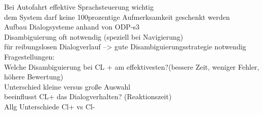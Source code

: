 \documentclass[12pt,a4paper]{scrartcl}
\begin{document}
Bei Autofahrt effektive Sprachsteuerung wichtig \\
dem System darf keine 100prozentige Aufmerksamkeit geschenkt werden\\
Aufbau Dialogsysteme anhand von ODP-s3\\
Disambiguierung oft notwendig (speziell bei Navigierung)\\
für reibungslosen Dialogverlauf --> gute Disambiguierungsstrategie notwendig\\
Fragestellungen:\\
Welche Disambiguierung bei CL + am effektivesten?(bessere Zeit, weniger Fehler, höhere Bewertung)\\
Unterschied kleine versus große Auswahl\\
beeinflusst CL+ das Dialogverhalten? (Reaktionszeit)\\
Allg Unterschiede Cl+ vs Cl- \\

\end{document}
